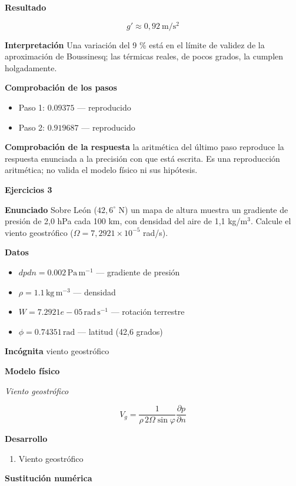 \documentclass[10pt,openany]{book}
\begin{document}
\noindent\textbf{Resultado}

\[
g' \approx 0{,}92\ \mathrm{m/s^{2}}
\]

\noindent\textbf{Interpretación}
Una variación del 9 \% está en el límite de validez de la aproximación de Boussinesq; las térmicas reales, de pocos grados, la cumplen holgadamente.

\noindent\textbf{Comprobación de los pasos}
\begin{itemize}
\item Paso 1: $0.09375$ — reproducido
\item Paso 2: $0.919687$ — reproducido
\end{itemize}

\noindent\textbf{Comprobación de la respuesta} la aritmética del último paso reproduce la respuesta enunciada a la precisión con que está escrita. Es una reproducción aritmética; no valida el modelo físico ni sus hipótesis.

\noindent\textbf{Ejercicios 3}

\noindent\textbf{Enunciado}
Sobre León (\(42{,}6^\circ\) N) un mapa de altura muestra un gradiente de presión de 2,0 hPa cada 100 km, con densidad del aire de 1,1 kg/m\(^3\). Calcule el viento geostrófico (\(\Omega = 7{,}2921\times 10^{-5}\) rad/s).

\noindent\textbf{Datos}
\begin{itemize}
\item $dpdn = 0.002\,\mathrm{Pa}\,\mathrm{m}^{-1}$ — gradiente de presión
\item $\rho = 1.1\,\mathrm{kg}\,\mathrm{m}^{-3}$ — densidad
\item $W = 7.2921e-05\,\mathrm{rad}\,\mathrm{s}^{-1}$ — rotación terrestre
\item $\phi = 0.74351\,\mathrm{rad}$ — latitud (42,6 grados)
\end{itemize}

\noindent\textbf{Incógnita}
viento geostrófico

\noindent\textbf{Modelo físico}

\noindent\textit{Viento geostrófico}

\[
V_g = \frac{1}{\rho\,2\Omega\sin\varphi}\frac{\partial p}{\partial n}
\]

\noindent\textbf{Desarrollo}
\begin{enumerate}
\item
Viento geostrófico
\end{enumerate}

\noindent\textbf{Sustitución numérica}
\end{document}
